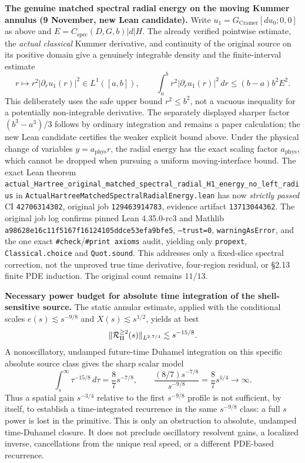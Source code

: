 \documentclass[11pt]{amsart}
\begin{document}
\medskip
\noindent\textbf{The genuine matched spectral radial energy on the
moving Kummer annulus (9 November, new Lean candidate).}
Write $u_1=G_{\mathrm{Cramer}}[d u_0;0,0]$ as above and
$E=C_{\mathrm{spec}}(D,G,b)|d|H$. The already verified pointwise estimate,
the \emph{actual classical} Kummer derivative, and continuity of the
original source on its positive domain give a genuinely integrable
density and the finite-interval estimate
\[
 r\mapsto r^2|\partial_r u_1(r)|^2\in L^1([a,b]),\qquad
 \int_a^b r^2|\partial_r u_1(r)|^2\,dr
 \le (b-a)b^2 E^2.
\]
This deliberately uses the safe upper bound $r^2\le b^2$, not a
vacuous inequality for a potentially non-integrable derivative.
The separately displayed sharper factor $(b^3-a^3)/3$ follows by
ordinary integration and remains a paper calculation; the new Lean
candidate certifies the weaker explicit bound above. Under the
physical change of variables $y=a_{\mathrm{phys}}r$, the radial
energy has the exact scaling factor $a_{\mathrm{phys}}$, which
cannot be dropped when pursuing a uniform moving-interface bound.
The exact Lean theorem
\texttt{actual\_Hartree\_original\_matched\_spectral\_radial\_H1\_energy\_no\_left\_radius}
in \texttt{ActualHartreeMatchedSpectralRadialEnergy.lean}
has now \emph{strictly passed} CI \texttt{42706314302}, original job
\texttt{129463914783}, evidence artifact \texttt{13713044362}.
The original job log confirms pinned Lean 4.35.0-rc3 and Mathlib
\texttt{a98628e16c11f5167f16124105ddce53efa9bfe5},
\texttt{--trust=0}, \texttt{warningAsError}, and the one exact
\texttt{\#check}/\texttt{\#print axioms} audit, yielding only
\texttt{propext}, \texttt{Classical.choice} and \texttt{Quot.sound}.
This addresses only a fixed-slice spectral correction, not the
unproved true time derivative, four-region residual, or §2.13
finite PDE induction. The original count remains $11/13$.


\medskip
\noindent\textbf{Necessary power budget for absolute time integration of the shell-sensitive source.}
The static annular estimate, applied with the conditional scales
$e(s)\lesssim s^{-9/8}$ and $X(s)\lesssim s^{1/2}$, yields at best
\[
 \|\mathcal R_{\rm H}^{\ge2}(s)\|_{L^{2,7/4}}\lesssim s^{-15/8}.
\]
A nonoscillatory, undamped future-time Duhamel integration on this
specific absolute source class gives the sharp scalar model
\[
 \int_s^\infty \tau^{-15/8}\,d\tau
   =\frac87s^{-7/8},\qquad
 \frac{(8/7)s^{-7/8}}{s^{-9/8}}
   =\frac87s^{1/4}\longrightarrow\infty.
\]
Thus a spatial gain $s^{-3/4}$ relative to the first $s^{-9/8}$
profile is not sufficient, by itself, to establish a time-integrated
recurrence in the same $s^{-9/8}$ class: a full $s$ power is lost
in the primitive. This is only an obstruction to absolute,
undamped time-Duhamel closure. It does not preclude oscillatory
resolvent gains, a localized inverse, cancellations from the
unique real speed, or a different PDE-based recurrence.
\end{document}
